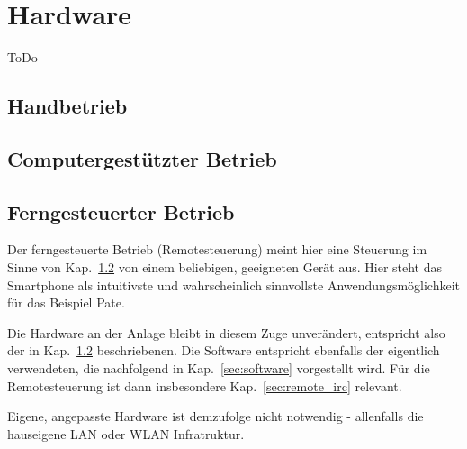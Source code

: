 \section{Hardware}
\label{sec:hardware}

ToDo

\subsection{Handbetrieb}
\label{sec:manual_operation}



\subsection{Computergest\"utzter Betrieb}
\label{sec:pc_operation}



\subsection{Ferngesteuerter Betrieb}
\label{sec:remote_operation}

Der ferngesteuerte Betrieb (Remotesteuerung) meint hier eine Steuerung im Sinne von Kap.~\ref{sec:pc_operation} von einem beliebigen, geeigneten Ger\"at aus.
Hier steht das Smartphone als intuitivste und wahrscheinlich sinnvollste Anwendungsm\"oglichkeit f\"ur das Beispiel Pate.

Die Hardware an der Anlage bleibt in diesem Zuge unver\"andert, entspricht also der in Kap.~\ref{sec:pc_operation} beschriebenen.
Die Software entspricht ebenfalls der eigentlich verwendeten, die nachfolgend in Kap.~\ref{sec:software} vorgestellt wird.
F\"ur die Remotesteuerung ist dann insbesondere Kap.~\ref{sec:remote_irc} relevant.

Eigene, angepasste Hardware ist demzufolge nicht notwendig - allenfalls die hauseigene LAN oder WLAN Infratruktur.